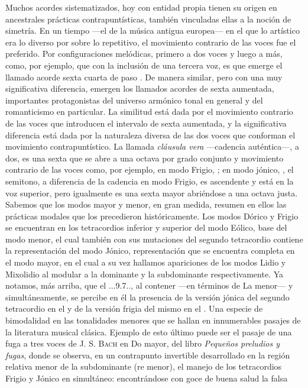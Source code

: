 \documentclass[a4paper,12pt]{article}
\begin{document}
\begin{multicols}{2}
Muchos acordes sistematizados, hoy con entidad propia tienen su origen en ancestrales prácticas contrapuntísticas, también vinculadas ellas a la noción de simetría. En un tiempo ---el de la música antigua europea--- en el que lo artístico era lo diverso por sobre lo repetitivo, el movimiento contrario de las voces fue el preferido. Por configuraciones melódicas, primero a dos voces y luego a más, como, por ejemplo,  que con la inclusión de una tercera voz, es que emerge el llamado acorde sexta cuarta de paso \hbox{.} De manera similar, pero con una muy significativa diferencia, emergen los llamados acordes de sexta aumentada, importantes protagonistas del universo armónico tonal en general y del romanticismo en particular. La similitud está dada por el movimiento contrario de las voces que introducen el intervalo de sexta aumentada, y la significativa diferencia está dada por la naturaleza diversa de las dos voces que conforman el movimiento contrapuntístico. La llamada \emph{cláusula vera} ---cadencia auténtica---, a dos, es una sexta que se abre a una octava por grado conjunto y movimiento contrario de las voces como, por ejemplo, en modo Frigio, \hbox{;} en modo jónico, \hbox{,} el semitono, a diferencia de la cadencia en modo Frigio, es ascendente y está en la voz superior, pero igualmente es una sexta mayor abriéndose a una octava justa. Sabemos que los modos mayor y menor, en gran medida, resumen en ellos las prácticas modales que los precedieron históricamente. Los modos Dórico y Frigio se encuentran en los tetracordios inferior y superior del modo Eólico, base del modo menor, el cual también con sus mutaciones del segundo tetracordio contiene la representación del modo Jónico, representación que se encuentra completa en el modo mayor, en el cual a su vez hallamos apariciones de los modos Lidio y Mixolidio al modular a la dominante y la subdominante respectivamente. Ya notamos, más arriba, que el \acorde.\Dohne..9\bemoltxt.7.., al contener ---en términos de La menor---  y  simultáneamente, se percibe en él la presencia de la versión jónica del segundo tetracordio en el  y de la versión frigia del mismo en el . Una especie de bimodalidad en las tonalidades menores que se hallan en innumerables pasajes de la literatura musical clásica. Ejemplo de esto último puede ser el pasaje de una fuga a tres voces de \textsc{J. S. Bach} en Do mayor, del libro \emph{Pequeños preludios y fugas}, donde se observa, en un contrapunto invertible desarrollado en la región relativa menor de la subdominante (re menor), el manejo de los tetracordios Frigio y Jónico en simultáneo:  encontrándose con goce de buena salud la falsa 
\end{multicols}
\end{document}
